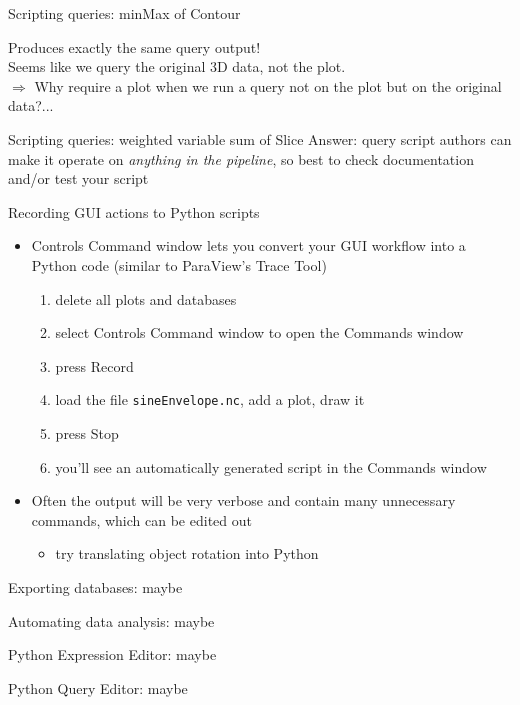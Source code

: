 \begin{frame}{Scripting queries: minMax of Contour}
  
  \pause
  Produces exactly the same query output!\\
  Seems like we query the original 3D data, not the plot.\\
  $\Rightarrow$ Why require a plot when we run a query not on the plot but on the original data?...
\end{frame}

\begin{frame}{Scripting queries: weighted variable sum of Slice}
  Answer: query script authors can make it operate on \emph{anything in the pipeline},
  so best to check documentation and/or test your script
  \bigskip
  
\end{frame}

\begin{frame}{Recording GUI actions to Python scripts}
  \begin{itemize}\setlength{\itemsep}{3mm}
  \item Controls \ra Command window lets you convert your GUI workflow into a Python code (similar to
    ParaView's Trace Tool)
    \begin{enumerate}\setlength{\itemsep}{1mm}
    \item delete all plots and databases
    \item select Controls \ra Command window to open the Commands window
    \item press Record
    \item load the file \texttt{sineEnvelope.nc}, add a plot, draw it
    \item press Stop
    \item you'll see an automatically generated script in the Commands window
    \end{enumerate}
  \item Often the output will be very verbose and contain many unnecessary commands, which can be edited out
    \begin{itemize}\setlength{\itemsep}{1mm}
    \item try translating object rotation into Python
    \end{itemize}
  \end{itemize}
\end{frame}

\begin{frame}{Exporting databases: maybe}
\end{frame}

\begin{frame}{Automating data analysis: maybe}
\end{frame}

\begin{frame}{Python Expression Editor: maybe}
\end{frame}

\begin{frame}{Python Query Editor: maybe}
\end{frame}
